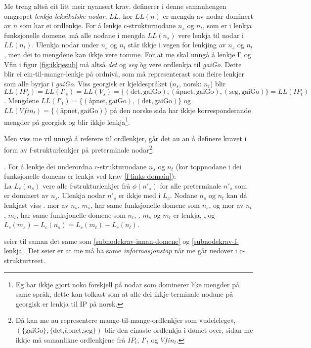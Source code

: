 \documentclass[11pt,a4paper,oneside,draft]{book}
\begin{document}
Me treng altså eit litt meir nyansert
krav. \citet[s.~77]{dyvik2009lmp} definerer i denne samanhengen
omgrepet \emph{lenkja leksikalske nodar}, $LL$, kor $LL(n)$ er mengda av
nodar dominert av $n$ som har ei ordlenkje. For å lenkje
c-strukturnodane $n_s$ og $n_t$, som er i lenkja funksjonelle domene,
må alle nodane i mengda $LL(n_s)$ vere lenkja til nodar i
$LL(n_t)$. Ulenkja nodar under $n_s$ og $n_t$ står ikkje i vegen for
lenkjing av $n_s$ og $n_t$, men dei to mengdene kan ikkje vere tomme.
For at me skal unngå å lenkje I' og Vfin i figur \ref{fig:ikkjesub} må
altså \emph{det} og \emph{seg} òg vere ordlenkja til \emph{gaiGo}. Dette blir ei
ein-til-mange-lenkje på ordnivå, som må representerast som fleire
lenkjer som alle byrjar i \emph{gaiGo}. Viss georgisk er kjeldespråket
($n_s$, norsk: $n_t$) blir
$LL(IP_s)=LL(I'_s)=LL(V_s)=\{(\text{det},\text{gaiGo}),(\text{åpnet},\text{gaiGo}),(\text{seg},\text{gaiGo})\}=LL(IP_t)$.
Mengdene
$LL(I'_t)=\{(\text{åpnet},\text{gaiGo}),(\text{det},\text{gaiGo})\}$
og $LL(Vfin_t)=\{(\text{åpnet},\text{gaiGo})\}$ på den norske sida har
ikkje korresponderande mengder på georgisk og blir ikkje lenkja\footnote{Eg har ikkje gjort noko forskjell på nodar som dominerer like
       mengder på same språk, dette kan tolkast som at alle dei
       ikkje-terminale nodane på georgisk er lenkja til IP på norsk. }.

Men viss me vil unngå å referere til ordlenkjer, går det au an å
definere kravet i form av f-strukturlenkjer på preterminale
nodar\footnote{Då kan me au representere mange-til-mange-ordlenkjer som
        «udelelege», $(\{\text{gaiGo}\},\{\text{det,åpnet,seg}\})$
        blir den einaste ordlenkja i dømet over, sidan me ikkje må
        samanlikne ordlenkjene frå $IP_t$, $I'_t$ og $Vfin_t$. }:

\ex. \label{subnodekrav-infotap} For å lenkje dei underordna
     c-strukturnodane $n_s$ og $n_t$ (kor toppnodane i dei
     funksjonelle domena er lenkja ved
     krav \ref{f-links-domain}):\\
     La $L_c(n_s)$ vere alle
     f-strukturlenkjer frå $\phi(n'_s)$ for alle preterminale $n'_s$
     som er dominert av $n_s$. Ulenkja nodar $n'_s$ er ikkje med i $L_c$.
     Nodane $n_s$ og $n_t$ kan då lenkjast viss
\a.  mor av $n_s$, $m_s$, har same funksjonelle domene som $n_s$,
     og mor av $n_t$, $m_t$, har same funksjonelle domene som $n_t$, 
\b.  $m_s$ og $m_t$ er lenkja, 
\c.  og $L_c(m_s)-L_c(n_s)=L_c(m_t)-L_c(n_t)$.


\Last[a og -b] seier til saman det same som
\ref{subnodekrav-innan-domene} og \ref{subnodekrav-f-lenkja}. Det
\Last[c] seier er at me må ha same \emph{informasjonstap} når me går
nedover i c-strukturtreet.
\end{document}
